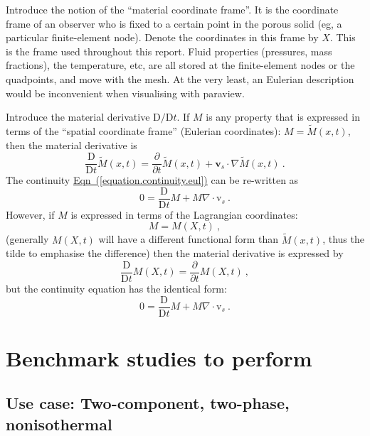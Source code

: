 \documentclass[12pt]{report}
\begin{document}
Introduce the notion of the ``material coordinate frame''.  It is the
coordinate frame of an observer who is fixed to a certain point in the
porous solid (eg, a particular finite-element node).  Denote the
coordinates in this frame by $X$.  This is the
frame used throughout this report.  Fluid properties (pressures, mass
fractions), the temperature, etc, are all stored at the finite-element
nodes or the quadpoints, and move with the mesh.  At the very least,
an Eulerian description would be inconvenient when visualising with
paraview.

Introduce the material derivative $\mathrm{D}/\mathrm{D} t$.  If $M$
is any property that is expressed in terms of the ``spatial coordinate
frame'' (Eulerian coordinates): $M=\tilde{M}(x,t)$, then the material
derivative is
\begin{equation}
\frac{\mathrm{D}}{\mathrm{D} t}\tilde{M}(x, t) = \frac{\partial
}{\partial t}\tilde{M}(x, t) + {\mathbf{v}}_{s}\cdot \nabla
\tilde{M}(x, t)\ .
\end{equation}
The continuity
\hyperref[equation.continuity.eul]{Eqn~(\ref*{equation.continuity.eul})}
can be re-written as
\begin{equation}
0 = \frac{\mathrm{D}}{\mathrm{D} t}M + M\nabla\cdot {\mathrm{v}}_{s}
\ .
\end{equation}
However, if $M$ is expressed in terms of the Lagrangian coordinates:
\begin{equation}
M = M(X, t) \ ,
\end{equation}
(generally $M(X, t)$ will have a different functional form than
$\tilde{M}(x,t)$, thus the tilde to emphasise the difference)
then the material derivative is expressed by
\begin{equation}
\frac{\mathrm{D}}{\mathrm{D} t}M(X, t) = \frac{\partial}{\partial
  t}M(X, t) \ ,
\end{equation}
but the continuity equation has the identical form:
\begin{equation}
0 = \frac{\mathrm{D}}{\mathrm{D} t}M + M\nabla\cdot {\mathrm{v}}_{s}
\ .
\end{equation}


\chapter{Benchmark studies to perform}


\section{Use case: Two-component, two-phase, nonisothermal}
\end{document}
